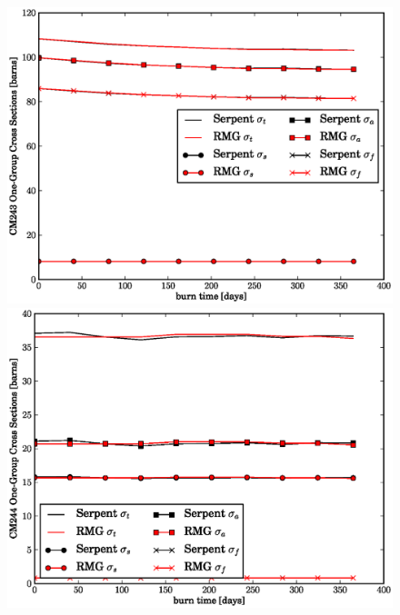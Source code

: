 \begin{figure}[htbp]
\begin{center}
\includegraphics[scale=0.3]{multigroup_method/figs/benchmark/CM243_1g_xs.eps}
\includegraphics[scale=0.3]{multigroup_method/figs/benchmark/CM244_1g_xs.eps}
\end{center}
\end{figure}
